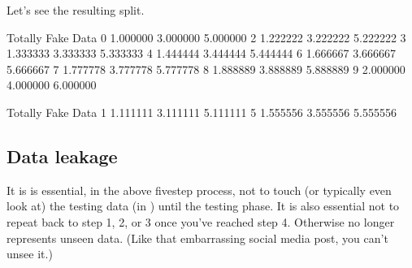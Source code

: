\documentclass[letterpaper,10pt,english]{jupyterBook}
\begin{document}
\begin{sphinxVerbatim}[commandchars=\\\{\}]
      
    
  \PYG{p}{[}\PYG{p}{]}
  \PYG{p}{[}\PYG{p}{]}
\end{sphinxVerbatim}

\sphinxAtStartPar
Let’s see the resulting split.

\begin{sphinxVerbatim}[commandchars=\\\{\}]
\end{sphinxVerbatim}

\begin{sphinxVerbatim}[commandchars=\\\{\}]
    Totally      Fake      Data
0  1.000000  3.000000  5.000000
2  1.222222  3.222222  5.222222
3  1.333333  3.333333  5.333333
4  1.444444  3.444444  5.444444
6  1.666667  3.666667  5.666667
7  1.777778  3.777778  5.777778
8  1.888889  3.888889  5.888889
9  2.000000  4.000000  6.000000
\end{sphinxVerbatim}

\begin{sphinxVerbatim}[commandchars=\\\{\}]
\end{sphinxVerbatim}

\begin{sphinxVerbatim}[commandchars=\\\{\}]
    Totally      Fake      Data
1  1.111111  3.111111  5.111111
5  1.555556  3.555556  5.555556
\end{sphinxVerbatim}


\subsection{Data leakage}
\label{\detokenize{chapter-17-machine-learning:data-leakage}}
\sphinxAtStartPar
It is is essential, in the above five\sphinxhyphen{}step process, not to touch (or typically even look at) the testing data (in ) until the testing phase.  It is also essential not to repeat back to step 1, 2, or 3 once you’ve reached step 4.  Otherwise  no longer represents unseen data.  (Like that embarrassing social media post, you can’t unsee it.)
\end{document}
